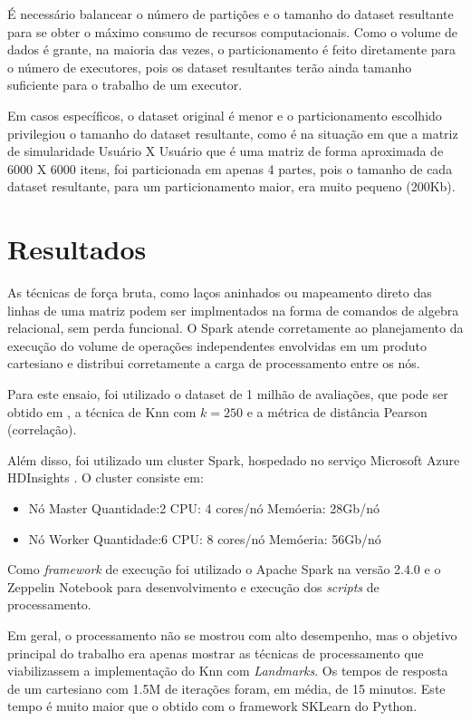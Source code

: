 \documentclass[12pt]{article}
\begin{document}
É necessário balancear o número de partições e o tamanho do dataset resultante para se obter o máximo consumo de recursos computacionais. Como o volume de dados é grante, na maioria das vezes, o particionamento é feito diretamente para o número de executores, pois os dataset resultantes terão ainda tamanho suficiente para o trabalho de um executor.

Em casos específicos, o dataset original é menor e o particionamento escolhido privilegiou o tamanho do dataset resultante, como é na situação em que a matriz de simularidade Usuário X Usuário que é uma matriz de forma aproximada de 6000 X 6000 itens, foi particionada em apenas 4 partes, pois o tamanho de cada dataset resultante, para um particionamento maior, era muito pequeno (200Kb).

\section{Resultados}\label{res}

As técnicas de força bruta, como laços aninhados ou mapeamento direto das linhas de uma matriz podem ser implmentados na forma de comandos de algebra relacional, sem perda funcional. O Spark atende corretamente ao planejamento da execução do volume de operações independentes envolvidas em um produto cartesiano e distribui corretamente a carga de processamento entre os nós.

Para este ensaio, foi utilizado o dataset de 1 milhão de avaliações, que pode ser obtido em \cite{movielens:19}, a técnica de Knn com $k = 250$ e a métrica de distância Pearson (correlação).

Além disso, foi utilizado um cluster Spark, hospedado no serviço Microsoft Azure \cite{azure:19} HDInsights \cite{hdinsights:19}. O cluster consiste em:

\begin{itemize}
	\item Nó Master
		\subitem Quantidade:2
		\subitem CPU: 4 cores/nó
		\subitem Memóeria: 28Gb/nó
	\item Nó Worker
		\subitem Quantidade:6
		\subitem CPU: 8 cores/nó
		\subitem Memóeria: 56Gb/nó
\end{itemize}

Como \textit{framework} de execução foi utilizado o Apache Spark na versão 2.4.0 e o Zeppelin Notebook para desenvolvimento e execução dos \textit{scripts} de processamento.

Em geral, o processamento não se mostrou com alto desempenho, mas o objetivo principal do trabalho era apenas mostrar as técnicas de processamento que viabilizassem a implementação do Knn com \textit{Landmarks}. Os tempos de resposta de um cartesiano com 1.5M de iterações foram, em média, de 15 minutos. Este tempo é muito maior que o obtido com o framework SKLearn do Python.
\end{document}
